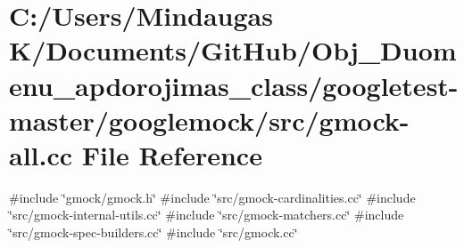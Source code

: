 \hypertarget{googletest-master_2googlemock_2src_2gmock-all_8cc}{}\section{C\+:/\+Users/\+Mindaugas K/\+Documents/\+Git\+Hub/\+Obj\+\_\+\+Duomenu\+\_\+apdorojimas\+\_\+class/googletest-\/master/googlemock/src/gmock-\/all.cc File Reference}
\label{googletest-master_2googlemock_2src_2gmock-all_8cc}
{\ttfamily \#include \char`\"{}gmock/gmock.\+h\char`\"{}}\newline
{\ttfamily \#include \char`\"{}src/gmock-\/cardinalities.\+cc\char`\"{}}\newline
{\ttfamily \#include \char`\"{}src/gmock-\/internal-\/utils.\+cc\char`\"{}}\newline
{\ttfamily \#include \char`\"{}src/gmock-\/matchers.\+cc\char`\"{}}\newline
{\ttfamily \#include \char`\"{}src/gmock-\/spec-\/builders.\+cc\char`\"{}}\newline
{\ttfamily \#include \char`\"{}src/gmock.\+cc\char`\"{}}\newline
